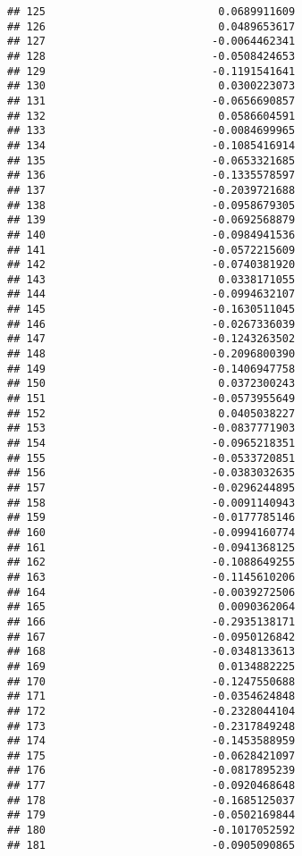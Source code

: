 \documentclass[
]{article}
\begin{document}
\begin{verbatim}
## 125                           0.0689911609
## 126                           0.0489653617
## 127                          -0.0064462341
## 128                          -0.0508424653
## 129                          -0.1191541641
## 130                           0.0300223073
## 131                          -0.0656690857
## 132                           0.0586604591
## 133                          -0.0084699965
## 134                          -0.1085416914
## 135                          -0.0653321685
## 136                          -0.1335578597
## 137                          -0.2039721688
## 138                          -0.0958679305
## 139                          -0.0692568879
## 140                          -0.0984941536
## 141                          -0.0572215609
## 142                          -0.0740381920
## 143                           0.0338171055
## 144                          -0.0994632107
## 145                          -0.1630511045
## 146                          -0.0267336039
## 147                          -0.1243263502
## 148                          -0.2096800390
## 149                          -0.1406947758
## 150                           0.0372300243
## 151                          -0.0573955649
## 152                           0.0405038227
## 153                          -0.0837771903
## 154                          -0.0965218351
## 155                          -0.0533720851
## 156                          -0.0383032635
## 157                          -0.0296244895
## 158                          -0.0091140943
## 159                          -0.0177785146
## 160                          -0.0994160774
## 161                          -0.0941368125
## 162                          -0.1088649255
## 163                          -0.1145610206
## 164                          -0.0039272506
## 165                           0.0090362064
## 166                          -0.2935138171
## 167                          -0.0950126842
## 168                          -0.0348133613
## 169                           0.0134882225
## 170                          -0.1247550688
## 171                          -0.0354624848
## 172                          -0.2328044104
## 173                          -0.2317849248
## 174                          -0.1453588959
## 175                          -0.0628421097
## 176                          -0.0817895239
## 177                          -0.0920468648
## 178                          -0.1685125037
## 179                          -0.0502169844
## 180                          -0.1017052592
## 181                          -0.0905090865

\end{verbatim}
\end{document}
